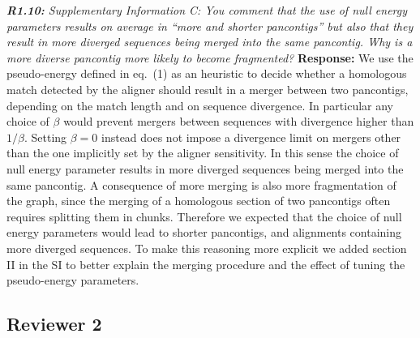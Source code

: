 \documentclass[aps,rmp,onecolumn]{revtex4-1}
\newcommand{\reviewer}[2]{{\it \textbf{#1:} #2\vskip 5mm}}
\newcommand{\response}[1]{{{\color{response}\textbf{Response:} #1}}\vskip 5mm}
\newcommand{\SIalgo}{II}
\begin{document}
\reviewer{R1.10}{Supplementary Information C: You comment that the use of null energy parameters results on average in ``more and shorter pancontigs'' but also that they result in more diverged sequences being merged into the same pancontig. Why is a more diverse pancontig more likely to become fragmented?}
\response{We use the pseudo-energy defined in eq.~(1) as an heuristic to decide whether a homologous match detected by the aligner should result in a merger between two pancontigs, depending on the match length and on sequence divergence. In particular any choice of $\beta$ would prevent mergers between sequences with divergence higher than $1/\beta$. Setting $\beta=0$ instead does not impose a divergence limit on mergers other than the one implicitly set by the aligner sensitivity. In this sense the choice of null energy parameter results in more diverged sequences being merged into the same pancontig. A consequence of more merging is also more fragmentation of the graph, since the merging of a homologous section of two pancontigs often requires splitting them in chunks. Therefore we expected that the choice of null energy parameters would lead to shorter pancontigs, and alignments containing more diverged sequences.
To make this reasoning more explicit we added section {\SIalgo} in the SI to better explain the merging procedure and the effect of tuning the pseudo-energy parameters.}


\subsection*{Reviewer 2}
\end{document}
